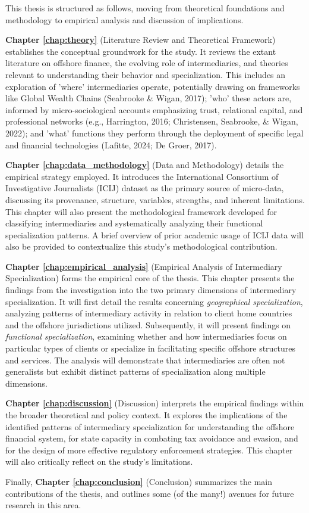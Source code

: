 This thesis is structured as follows, moving from theoretical foundations and methodology to empirical analysis and discussion of implications.

\textbf{Chapter \ref{chap:theory}} (Literature Review and Theoretical Framework) establishes the conceptual groundwork for the study. It reviews the extant literature on offshore finance, the evolving role of intermediaries, and theories relevant to understanding their behavior and specialization. This includes an exploration of 'where' intermediaries operate, potentially drawing on frameworks like Global Wealth Chains (Seabrooke \& Wigan, 2017); 'who' these actors are, informed by micro-sociological accounts emphasizing trust, relational capital, and professional networks (e.g., Harrington, 2016; Christensen, Seabrooke, \& Wigan, 2022); and 'what' functions they perform through the deployment of specific legal and financial technologies (Lafitte, 2024; De Groer, 2017).

\textbf{Chapter \ref{chap:data_methodology}} (Data and Methodology) details the empirical strategy employed. It introduces the International Consortium of Investigative Journalists (ICIJ) dataset as the primary source of micro-data, discussing its provenance, structure, variables, strengths, and inherent limitations. This chapter will also present the methodological framework developed for classifying intermediaries and systematically analyzing their functional specialization patterns. A brief overview of prior academic usage of ICIJ data will also be provided to contextualize this study's methodological contribution.

\textbf{Chapter \ref{chap:empirical_analysis}} (Empirical Analysis of Intermediary Specialization) forms the empirical core of the thesis. This chapter presents the findings from the investigation into the two primary dimensions of intermediary specialization. It will first detail the results concerning \textit{geographical specialization}, analyzing patterns of intermediary activity in relation to client home countries and the offshore jurisdictions utilized. Subsequently, it will present findings on \textit{functional specialization}, examining whether and how intermediaries focus on particular types of clients or specialize in facilitating specific offshore structures and services. The analysis will demonstrate that intermediaries are often not generalists but exhibit distinct patterns of specialization along multiple dimensions.

\textbf{Chapter \ref{chap:discussion}} (Discussion) interprets the empirical findings within the broader theoretical and policy context. It explores the implications of the identified patterns of intermediary specialization for understanding the offshore financial system, for state capacity in combating tax avoidance and evasion, and for the design of more effective regulatory enforcement strategies. This chapter will also critically reflect on the study's limitations.

Finally, \textbf{Chapter \ref{chap:conclusion}} (Conclusion) summarizes the main contributions of the thesis, and outlines some (of the many!) avenues for future research in this area. 
